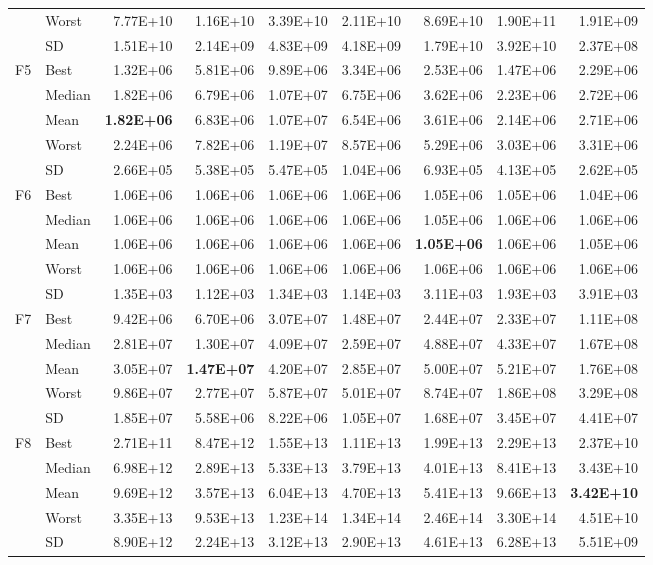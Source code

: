\documentclass[10pt,a4paper]{article}
\newcommand{\bestval}[1]{\textbf{#1}}
\begin{document}
\begin{table}[p]
\begin{tabular}{llrrrrrrr}
 & Worst & 7.77E+10 & 1.16E+10 & 3.39E+10 & 2.11E+10 & 8.69E+10 & 1.90E+11 & 1.91E+09 \\
 & SD & 1.51E+10 & 2.14E+09 & 4.83E+09 & 4.18E+09 & 1.79E+10 & 3.92E+10 & 2.37E+08 \\
\midrule
F5 & Best & 1.32E+06 & 5.81E+06 & 9.89E+06 & 3.34E+06 & 2.53E+06 & 1.47E+06 & 2.29E+06 \\
 & Median & 1.82E+06 & 6.79E+06 & 1.07E+07 & 6.75E+06 & 3.62E+06 & 2.23E+06 & 2.72E+06 \\
 & Mean & \bestval{1.82E+06} & 6.83E+06 & 1.07E+07 & 6.54E+06 & 3.61E+06 & 2.14E+06 & 2.71E+06 \\
 & Worst & 2.24E+06 & 7.82E+06 & 1.19E+07 & 8.57E+06 & 5.29E+06 & 3.03E+06 & 3.31E+06 \\
 & SD & 2.66E+05 & 5.38E+05 & 5.47E+05 & 1.04E+06 & 6.93E+05 & 4.13E+05 & 2.62E+05 \\
\midrule
F6 & Best & 1.06E+06 & 1.06E+06 & 1.06E+06 & 1.06E+06 & 1.05E+06 & 1.05E+06 & 1.04E+06 \\
 & Median & 1.06E+06 & 1.06E+06 & 1.06E+06 & 1.06E+06 & 1.05E+06 & 1.06E+06 & 1.06E+06 \\
 & Mean & 1.06E+06 & 1.06E+06 & 1.06E+06 & 1.06E+06 & \bestval{1.05E+06} & 1.06E+06 & 1.05E+06 \\
 & Worst & 1.06E+06 & 1.06E+06 & 1.06E+06 & 1.06E+06 & 1.06E+06 & 1.06E+06 & 1.06E+06 \\
 & SD & 1.35E+03 & 1.12E+03 & 1.34E+03 & 1.14E+03 & 3.11E+03 & 1.93E+03 & 3.91E+03 \\
\midrule
F7 & Best & 9.42E+06 & 6.70E+06 & 3.07E+07 & 1.48E+07 & 2.44E+07 & 2.33E+07 & 1.11E+08 \\
 & Median & 2.81E+07 & 1.30E+07 & 4.09E+07 & 2.59E+07 & 4.88E+07 & 4.33E+07 & 1.67E+08 \\
 & Mean & 3.05E+07 & \bestval{1.47E+07} & 4.20E+07 & 2.85E+07 & 5.00E+07 & 5.21E+07 & 1.76E+08 \\
 & Worst & 9.86E+07 & 2.77E+07 & 5.87E+07 & 5.01E+07 & 8.74E+07 & 1.86E+08 & 3.29E+08 \\
 & SD & 1.85E+07 & 5.58E+06 & 8.22E+06 & 1.05E+07 & 1.68E+07 & 3.45E+07 & 4.41E+07 \\
\midrule
F8 & Best & 2.71E+11 & 8.47E+12 & 1.55E+13 & 1.11E+13 & 1.99E+13 & 2.29E+13 & 2.37E+10 \\
 & Median & 6.98E+12 & 2.89E+13 & 5.33E+13 & 3.79E+13 & 4.01E+13 & 8.41E+13 & 3.43E+10 \\
 & Mean & 9.69E+12 & 3.57E+13 & 6.04E+13 & 4.70E+13 & 5.41E+13 & 9.66E+13 & \bestval{3.42E+10} \\
 & Worst & 3.35E+13 & 9.53E+13 & 1.23E+14 & 1.34E+14 & 2.46E+14 & 3.30E+14 & 4.51E+10 \\
 & SD & 8.90E+12 & 2.24E+13 & 3.12E+13 & 2.90E+13 & 4.61E+13 & 6.28E+13 & 5.51E+09 \\
\bottomrule
\end{tabular}
\end{table}
\end{document}
